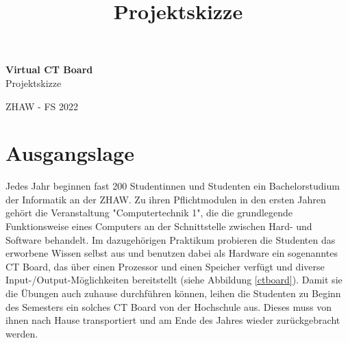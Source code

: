 \documentclass[10pt]{article}
\title{Projektskizze}
\begin{document}
\begin{titlepage}

\raggedleft %
	
	\vspace*{\baselineskip} %
	
	
	\vspace*{0.167\textheight} %
	
	\textbf{\LARGE Virtual CT Board}\\[\baselineskip] %
	
	\Huge Projektskizze\\[\baselineskip] %
	
	\vfill %
	
	{\large ZHAW - FS 2022}
	
	\vspace*{3\baselineskip} %


\end{titlepage}

\tableofcontents

\newpage 

\section{Ausgangslage}

Jedes Jahr beginnen fast 200 Studentinnen und Studenten ein Bachelorstudium der Informatik an der ZHAW. Zu ihren Pflichtmodulen in den ersten Jahren gehört die Veranstaltung "Computertechnik 1", die die grundlegende Funktionsweise eines Computers an der Schnittstelle zwischen Hard- und Software behandelt. Im dazugehörigen Praktikum probieren die Studenten das erworbene Wissen selbst aus und benutzen dabei als Hardware ein sogenanntes CT Board, das über einen Prozessor und einen Speicher verfügt und diverse Input-/Output-Möglichkeiten bereitstellt (siehe Abbildung \ref{ctboard}). Damit sie die Übungen auch zuhause durchführen können, leihen die Studenten zu Beginn des Semesters ein solches CT Board von der Hochschule aus. Dieses muss von ihnen nach Hause transportiert und am Ende des Jahres wieder zurückgebracht werden.
\end{document}

